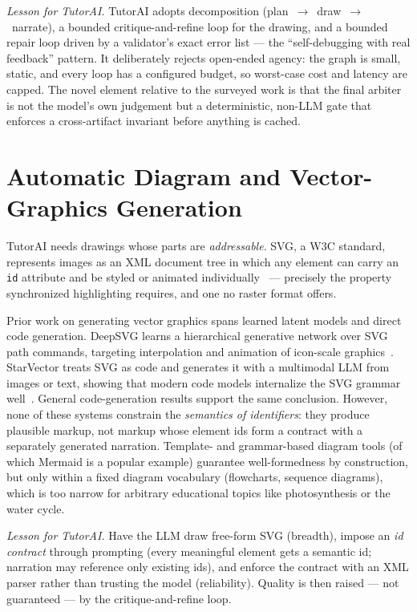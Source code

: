 \emph{Lesson for TutorAI.} TutorAI adopts decomposition
(plan~$\to$~draw~$\to$~narrate), a bounded critique-and-refine loop for the
drawing, and a bounded repair loop driven by a validator's exact error list
--- the ``self-debugging with real feedback'' pattern. It deliberately
rejects open-ended agency: the graph is small, static, and every loop has a
configured budget, so worst-case cost and latency are capped. The novel
element relative to the surveyed work is that the final arbiter is not the
model's own judgement but a deterministic, non-LLM gate that enforces a
cross-artifact invariant before anything is cached.

\section{Automatic Diagram and Vector-Graphics Generation}

TutorAI needs drawings whose parts are \emph{addressable}. SVG, a W3C
standard, represents images as an XML document tree in which any element can
carry an \texttt{id} attribute and be styled or animated
individually~\cite{svgspec} --- precisely the property synchronized
highlighting requires, and one no raster format offers.

Prior work on generating vector graphics spans learned latent models and
direct code generation. DeepSVG learns a hierarchical generative network over
SVG path commands, targeting interpolation and animation of icon-scale
graphics~\cite{carlier2020deepsvg}. StarVector treats SVG as code and
generates it with a multimodal LLM from images or text, showing that
modern code models internalize the SVG grammar
well~\cite{rodriguez2023starvector}. General code-generation results
\cite{chen2021codex} support the same conclusion. However, none of these
systems constrain the \emph{semantics of identifiers}: they produce plausible
markup, not markup whose element ids form a contract with a separately
generated narration. Template- and grammar-based diagram tools (of which
Mermaid is a popular example) guarantee well-formedness by construction, but
only within a fixed diagram vocabulary (flowcharts, sequence diagrams), which
is too narrow for arbitrary educational topics like photosynthesis or the
water cycle.

\emph{Lesson for TutorAI.} Have the LLM draw free-form SVG (breadth), impose
an \emph{id contract} through prompting (every meaningful element gets a
semantic id; narration may reference only existing ids), and enforce the
contract with an XML parser rather than trusting the model (reliability).
Quality is then raised --- not guaranteed --- by the critique-and-refine
loop.

